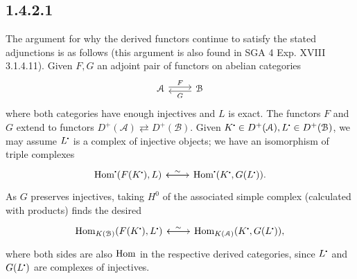 \documentclass[deligne.tex]{subfiles}
\begin{document}
	\subsection*{1.4.2.1} The argument for why the derived functors continue to
	satisfy the stated adjunctions is as follows (this argument is also found
	in SGA 4 Exp. XVIII 3.1.4.11). Given $F,G$ an adjoint pair
	of functors on abelian categories
	\begin{equation*}\begin{tikzcd}\mathcal A\arrow[r,shift left=.5ex,"{F}"]&\mathcal B \arrow[l,shift left=.5ex,"{G}"]\end{tikzcd}\end{equation*}
	where both categories have enough injectives and $L$ is exact.
	The functors $F$ and $G$ extend to
	functors $D^+(\mathcal A)\rightleftarrows D^+(\mathcal B)$.
	Given $K^\dotp\in D^+(\mathcal A),L^\dotp\in D^+(\mathcal B)$,
	we may assume $L^\dotp$ is a complex of injective objects;
	we have an isomorphism of triple complexes
	\begin{equation*}
		\begin{tikzcd}
		\Hom^\dotp(F(K^\dotp),L)\arrow[r,leftrightarrow,"{\sim}"]&\Hom^\dotp(K^\dotp,G(L^\dotp))\arrow[l].
		\end{tikzcd}
	\end{equation*}
	As $G$ preserves injectives, taking $H^0$ of the associated simple complex 
	(calculated with products) finds the desired
	\begin{equation*}
	\begin{tikzcd}
		\Hom_{K(\mathcal B)}(F(K^\dotp),L^\dotp)\arrow[r,leftrightarrow,"{\sim}"]&
		\Hom_{K(\mathcal A)}(K^\dotp,G(L^\dotp)),\arrow[l]
	\end{tikzcd}
	\end{equation*}
	where both sides are also $\operatorname{Hom}$ in the respective derived categories,
	since $L^\dotp$ and $G(L^\dotp)$ are complexes of injectives.
	
\end{document}
